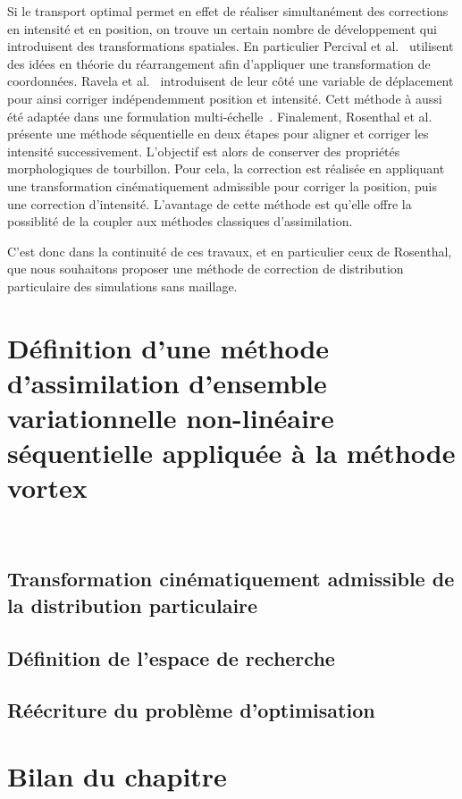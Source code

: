 Si le transport optimal permet en effet de réaliser simultanément des corrections en intensité et en position, on trouve un certain nombre de développement qui introduisent des transformations spatiales. En particulier Percival et al.~\cite{percival_department_2008} utilisent des idées en théorie du réarrangement afin d'appliquer une transformation de coordonnées. Ravela et al.~\cite{ravela_data_2007} introduisent de leur côté une variable de déplacement pour ainsi corriger indépendemment position et intensité. Cett méthode à aussi été adaptée dans une formulation multi-échelle~\cite{ying_multiscale_2019,ying_improving_2023}. Finalement, Rosenthal et al.~\cite{rosenthal_displacement_2017} présente une méthode séquentielle en deux étapes pour aligner et corriger les intensité successivement. L'objectif est alors de conserver des propriétés morphologiques de tourbillon. Pour cela, la correction est réalisée en appliquant une transformation cinématiquement admissible pour corriger la position, puis une correction d'intensité. L'avantage de cette méthode est qu'elle offre la possiblité de la coupler aux méthodes classiques d'assimilation.

C'est donc dans la continuité de ces travaux, et en particulier ceux de Rosenthal, que nous souhaitons proposer une méthode de correction de distribution particulaire des simulations sans maillage.

\section{Définition d'une méthode d'assimilation d'ensemble variationnelle non-linéaire séquentielle appliquée à la méthode vortex}~\label{sec:align_vortex}

\subsection{Transformation cinématiquement admissible de la distribution particulaire}

\subsection{Définition de l'espace de recherche}

\subsection{Réécriture du problème d'optimisation}

\section{Bilan du chapitre}

